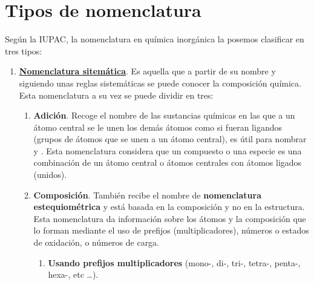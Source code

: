 \documentclass[11pt, a4paper]{article}
\begin{document}
\section{Tipos de nomenclatura}
Según la IUPAC, la nomenclatura en química inorgánica la posemos clasificar en tres tipos:
\begin{enumerate}
    \item \textbf{\uline{Nomenclatura sitemática}}. Es aquella que a partir de su nombre y siguiendo unas reglas sistemáticas se puede conocer la composición química. Esta nomenclatura a su vez se puede dividir en tres:
          \begin{enumerate}
              \item \textbf{Adición}. Recoge el nombre de las sustancias químicas en las que a un átomo central se le unen los demás átomos como si fueran ligandos (grupos de átomos que se unen a un átomo central), es útil para nombrar  y . Esta nomenclatura considera que un compuesto o una especie es una combinación de un átomo central o átomos centrales con átomos ligados (unidos).
              \item \textbf{Composición}. También recibe el nombre de \textbf{nomenclatura estequiométrica} y está basada en la composición y no en la estructura. Esta nomenclatura da información sobre los átomos y la composición que lo forman mediante el uso de prefijos  (multiplicadores), números o estados de oxidación, o números de carga.
                    \begin{enumerate}[label=\itembolascolor{\arabic*}{blue}]
                        \item \textbf{Usando prefijos multiplicadores} (mono-, di-, tri-, tetra-, penta-, hexa-, etc \dots).

\end{enumerate}
\end{enumerate}
\end{enumerate}
\end{document}
